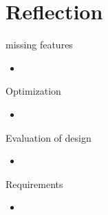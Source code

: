 \section{Reflection}

\begin{frame}{missing features}%
	\begin{itemize}
		\item
	\end{itemize}
\end{frame}

\begin{frame}{Optimization}
	\begin{itemize}
		\item
	\end{itemize}
\end{frame}

\begin{frame}{Evaluation of design}
	\begin{itemize}
		\item
	\end{itemize}
\end{frame}

\begin{frame}{Requirements}%
	\begin{itemize}
		\item
	\end{itemize}
\end{frame}
